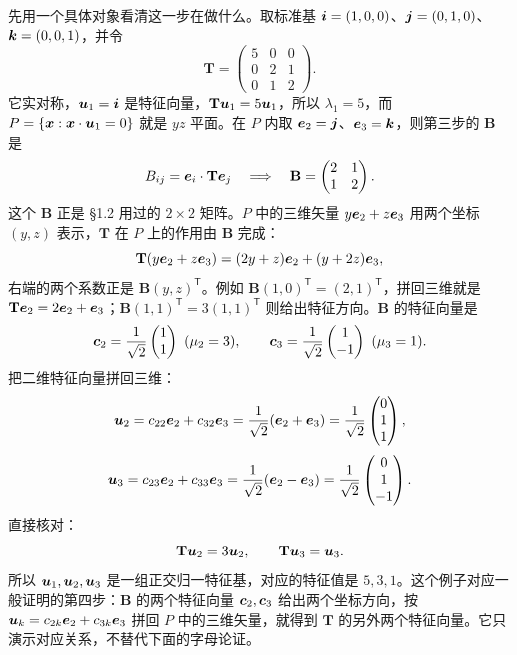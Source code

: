 \documentclass[11pt]{ctexart}
\newcommand{\ten}[1]{\mathbf{#1}}
\newcommand{\step}[1]{\par\smallskip\noindent{\color{violetdeep}\bfseries #1}\hspace{0.35em}}
\begin{document}
\step{第四步：在平面内用 $2\times2$ 引理。}
先用一个具体对象看清这一步在做什么。取标准基 $\boldsymbol{i}=(1,0,0)$、$\boldsymbol{j}=(0,1,0)$、$\boldsymbol{k}=(0,0,1)$，并令
\[
\ten T=\begin{pmatrix}5&0&0\\0&2&1\\0&1&2\end{pmatrix}.
\]
它实对称，$\boldsymbol{u}_1=\boldsymbol{i}$ 是特征向量，$\ten T\vect u_1=5\vect u_1$，所以 $\lambda_1=5$，而 $P=\{\boldsymbol{x}:\boldsymbol{x}\cdot\boldsymbol{u}_1=0\}$ 就是 $yz$ 平面。在 $P$ 内取 $\boldsymbol{e}_2=\boldsymbol{j}$、$\boldsymbol{e}_3=\boldsymbol{k}$，则第三步的 $\ten B$ 是
\[
B_{ij}=\vect e_i\cdot\ten T\vect e_j
\quad\Longrightarrow\quad
\ten B=\begin{pmatrix}2&1\\1&2\end{pmatrix}.
\]
这个 $\ten B$ 正是 \S1.2 用过的 $2\times2$ 矩阵。$P$ 中的三维矢量 $y\boldsymbol{e}_2+z\boldsymbol{e}_3$ 用两个坐标 $(y,z)$ 表示，$\ten T$ 在 $P$ 上的作用由 $\ten B$ 完成：
\[
\ten T(y\vect e_2+z\vect e_3)
=(2y+z)\vect e_2+(y+2z)\vect e_3,
\]
右端的两个系数正是 $\ten B(y,z)^{\mathsf T}$。例如 $\ten B(1,0)^{\mathsf T}=(2,1)^{\mathsf T}$，拼回三维就是 $\ten T\vect e_2=2\vect e_2+\vect e_3$；$\ten B(1,1)^{\mathsf T}=3(1,1)^{\mathsf T}$ 则给出特征方向。$\ten B$ 的特征向量是
\[
\vect c_2=\frac{1}{\sqrt2}\begin{pmatrix}1\\1\end{pmatrix}\ (\mu_2=3),
\qquad
\vect c_3=\frac{1}{\sqrt2}\begin{pmatrix}1\\-1\end{pmatrix}\ (\mu_3=1).
\]
把二维特征向量拼回三维：
\[
\boldsymbol{u}_2=c_{22}\boldsymbol{e}_2+c_{32}\boldsymbol{e}_3
=\frac{1}{\sqrt2}(\boldsymbol{e}_2+\boldsymbol{e}_3)
=\frac{1}{\sqrt2}\begin{pmatrix}0\\1\\1\end{pmatrix},
\]
\[
\boldsymbol{u}_3=c_{23}\boldsymbol{e}_2+c_{33}\boldsymbol{e}_3
=\frac{1}{\sqrt2}(\boldsymbol{e}_2-\boldsymbol{e}_3)
=\frac{1}{\sqrt2}\begin{pmatrix}0\\1\\-1\end{pmatrix}.
\]
直接核对：
\[
\ten T\vect u_2=3\vect u_2,\qquad
\ten T\vect u_3=\vect u_3 .
\]
所以 $\boldsymbol{u}_1,\boldsymbol{u}_2,\boldsymbol{u}_3$ 是一组正交归一特征基，对应的特征值是 $5,3,1$。这个例子对应一般证明的第四步：$\ten B$ 的两个特征向量 $\boldsymbol{c}_2,\boldsymbol{c}_3$ 给出两个坐标方向，按 $\boldsymbol{u}_k=c_{2k}\boldsymbol{e}_2+c_{3k}\boldsymbol{e}_3$ 拼回 $P$ 中的三维矢量，就得到 $\ten T$ 的另外两个特征向量。它只演示对应关系，不替代下面的字母论证。
\end{document}
